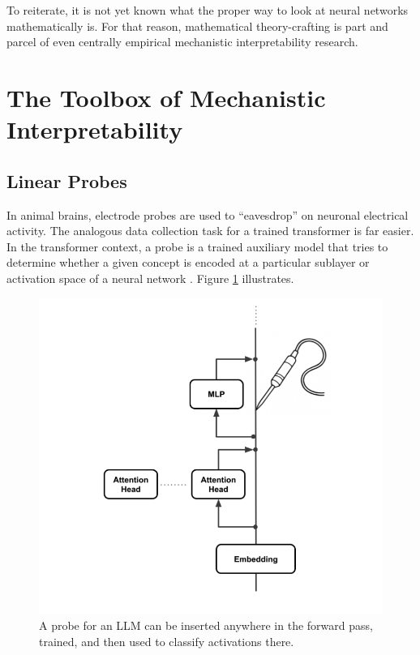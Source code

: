 To reiterate, it is not yet known what the proper way to look at neural
networks mathematically is. For that reason, mathematical theory-crafting is
part and parcel of even centrally empirical mechanistic interpretability
research.

\section{The Toolbox of Mechanistic Interpretability}

\subsection{Linear Probes}

In animal brains, electrode probes are used to ``eavesdrop'' on neuronal
electrical activity. The analogous data collection task for a trained
transformer is far easier. In the transformer context, a probe is a trained
auxiliary model that tries to determine whether a given concept is encoded at a
particular sublayer or activation space of a neural
network \cite{alain2018intermediate, belinkov2021classifiers}. Figure
\ref{linearProbe} illustrates.

\begin{figure}[ht]
\centering
\includegraphics[scale=.5]{./images/linearProbe.png}
\caption[Jeff Yoshimi; the line art for the probe was generated by ChatGPT.]{ A
      probe for an LLM can be inserted anywhere in the forward pass, trained,
      and then used to classify activations there.}
\label{linearProbe}
\end{figure}


